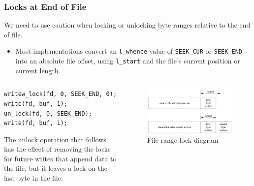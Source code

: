 \documentclass[newPxFont,sthlmFooter,nooffset]{beamer}
\begin{document}
\begin{frame}[t]
\begin{columns}[t]
\begin{column}{0.59\textwidth}
  \end{column}

\end{columns}

\end{frame}


\begin{frame}[fragile,t]
  \frametitle{Locks at End of File}
We need to use caution when locking or unlocking byte ranges relative to the end of file.
\begin{itemize}
\item Most implementations convert an \texttt{l\_whence} value of \texttt{SEEK\_CUR} or \texttt{SEEK\_END} into an absolute file offset, using \texttt{l\_start} and the file’s current position or current length.
\end{itemize}
\begin{columns}[t]
  \begin{column}{0.41\textwidth}
    {\footnotesize
\begin{verbatim}
writew_lock(fd, 0, SEEK_END, 0);
write(fd, buf, 1);
un_lock(fd, 0, SEEK_END);
write(fd, buf, 1);
\end{verbatim}

The unlock operation that follows has the effect of removing the locks for future writes that append data to the file, but it leaves a lock on the last byte in the file.
    }
  \end{column}
  \begin{column}{0.59\textwidth}
    \begin{figure}[h]
      \includegraphics[width=1\linewidth]{figures/fig14_10-filerange.png}
      \caption{File range lock diagram}
    \end{figure}

  \end{column}

\end{columns}

\end{frame}
\end{document}
